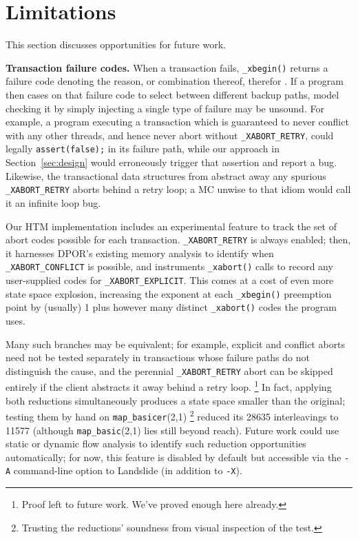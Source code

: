 \documentclass[10pt]{sigplanconf}
\begin{document}

\section{Limitations}
\label{sec:warpzone}

This section discusses opportunities for future work.

{\bf Transaction failure codes.}
When a transaction fails, {\tt \_xbegin()} returns a failure code
denoting the reason, or combination thereof, therefor \cite{htm-gcc}.
If a program then cases on that failure code to select between different backup paths,
model checking it by simply injecting a single type of failure may be unsound.
For example, a program executing a transaction which is guaranteed to never conflict with any other threads,
and hence never abort without {\tt \_XABORT\_RETRY},
could legally {\tt assert(false);} in its failure path,
while our approach in Section~\ref{sec:design} would erroneously trigger that assertion and report a bug.
Likewise, the transactional data structures from \cite{htm-mario}
abstract away any spurious {\tt \_XABORT\_RETRY} aborts behind a retry loop;
a MC unwise to that idiom would call it an infinite loop bug.

Our HTM implementation includes an experimental feature
to track the set of abort codes possible for each transaction.
{\tt \_XABORT\_RETRY} is always enabled;
then,
it harnesses DPOR's existing memory analysis to identify when {\tt \_XABORT\_CONFLICT} is possible,
and instruments {\tt \_xabort()} calls to record any user-supplied codes for {\tt \_XABORT\_EXPLICIT}.
This comes at a cost of even more state space explosion,
increasing the exponent at each {\tt \_xbegin()} preemption point
by (usually) 1 plus however many distinct {\tt \_xabort()} codes the program uses.

Many such branches may be equivalent;
for example,
explicit and conflict aborts need not be tested separately in transactions
whose failure paths do not distinguish the cause,
and the perennial {\tt \_XABORT\_RETRY} abort can be skipped entirely
if the client abstracts it away behind a retry loop.%
\footnote{Proof left to future work. We've proved enough here already.}
In fact, applying both reductions simultaneously
produces a state space smaller than the original;
testing them by hand
on {\tt map\_basicer}(2,1)%
\footnote{Trusting the reductions' soundness from visual inspection of the test.}
reduced its 28635 interleavings to 11577
(although {\tt map\_basic}(2,1) lies still beyond reach).
%
%
Future work could use static or dynamic flow analysis to
identify such reduction opportunities automatically;
for now, this feature is disabled by default but accessible via the {\tt -A} command-line option
to Landslide (in addition to {\tt -X}).
\end{document}
